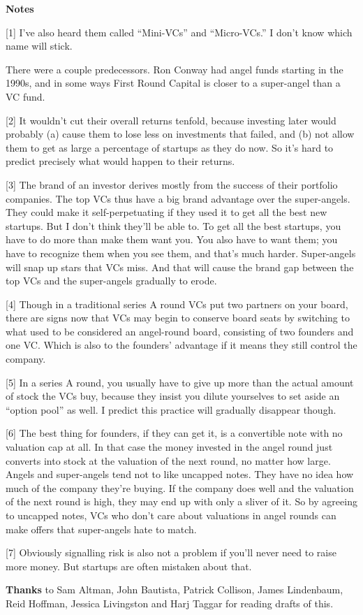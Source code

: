 \textbf{Notes}

{[}1{]} I've also heard them called ``Mini-VCs'' and ``Micro-VCs.'' I
don't know which name will stick.

There were a couple predecessors. Ron Conway had angel funds starting in
the 1990s, and in some ways First Round Capital is closer to a
super-angel than a VC fund.

{[}2{]} It wouldn't cut their overall returns tenfold, because investing
later would probably (a) cause them to lose less on investments that
failed, and (b) not allow them to get as large a percentage of startups
as they do now. So it's hard to predict precisely what would happen to
their returns.

{[}3{]} The brand of an investor derives mostly from the success of
their portfolio companies. The top VCs thus have a big brand advantage
over the super-angels. They could make it self-perpetuating if they used
it to get all the best new startups. But I don't think they'll be able
to. To get all the best startups, you have to do more than make them
want you. You also have to want them; you have to recognize them when
you see them, and that's much harder. Super-angels will snap up stars
that VCs miss. And that will cause the brand gap between the top VCs and
the super-angels gradually to erode.

{[}4{]} Though in a traditional series A round VCs put two partners on
your board, there are signs now that VCs may begin to conserve board
seats by switching to what used to be considered an angel-round board,
consisting of two founders and one VC. Which is also to the founders'
advantage if it means they still control the company.

{[}5{]} In a series A round, you usually have to give up more than the
actual amount of stock the VCs buy, because they insist you dilute
yourselves to set aside an ``option pool'' as well. I predict this
practice will gradually disappear though.

{[}6{]} The best thing for founders, if they can get it, is a
convertible note with no valuation cap at all. In that case the money
invested in the angel round just converts into stock at the valuation of
the next round, no matter how large. Angels and super-angels tend not to
like uncapped notes. They have no idea how much of the company they're
buying. If the company does well and the valuation of the next round is
high, they may end up with only a sliver of it. So by agreeing to
uncapped notes, VCs who don't care about valuations in angel rounds can
make offers that super-angels hate to match.

{[}7{]} Obviously signalling risk is also not a problem if you'll never
need to raise more money. But startups are often mistaken about that.

\textbf{Thanks} to Sam Altman, John Bautista, Patrick Collison, James
Lindenbaum, Reid Hoffman, Jessica Livingston and Harj Taggar for reading
drafts of this.
